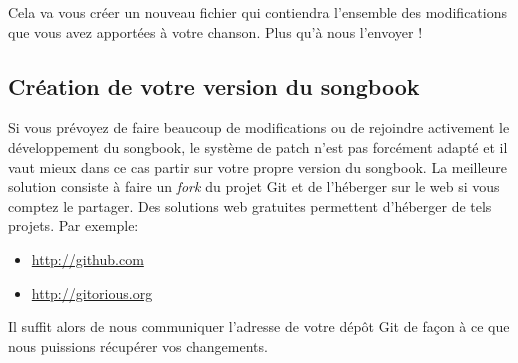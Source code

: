 \documentclass[versionenligne]{patacrep}
\begin{document}

Cela va vous créer un nouveau fichier  qui contiendra
l'ensemble des modifications que vous avez apportées à votre
chanson. Plus qu'à nous l'envoyer !

\subsection{Création de votre version du songbook}

Si vous prévoyez de faire beaucoup de modifications ou de rejoindre
activement le développement du songbook, le système de patch n'est pas
forcément adapté et il vaut mieux dans ce cas partir sur votre propre
version du songbook. La meilleure solution consiste à faire un
\emph{fork} du projet Git et de l'héberger sur le web si vous comptez
le partager. Des solutions web gratuites permettent d'héberger de tels
projets. Par exemple:

\begin{itemize}
\item \url{http://github.com}
\item \url{http://gitorious.org}
\end{itemize}

Il suffit alors de nous communiquer l'adresse de votre dépôt Git de
façon à ce que nous puissions récupérer vos changements.


%
%
%
%
%
\end{document}

